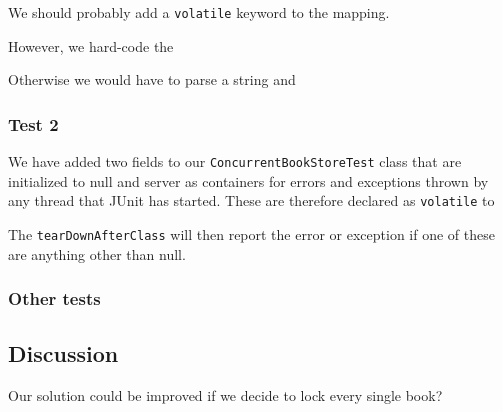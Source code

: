 \documentclass[11pt]{article}
\begin{document}
We should probably add a \texttt{volatile} keyword to the mapping.

However, we hard-code the 

Otherwise we would have to parse a string and 

\subsubsection*{Test 2}

We have added two fields to our \texttt{ConcurrentBookStoreTest} class that are initialized
to null and server as containers for errors and exceptions thrown by any thread that
JUnit has started. These are therefore declared as \texttt{volatile} to

The \texttt{tearDownAfterClass} will then report the error or exception if one
of these are anything other than null.

\subsubsection*{Other tests}

\subsection*{Discussion}

Our solution could be improved if we decide to lock every single book?
\end{document}
